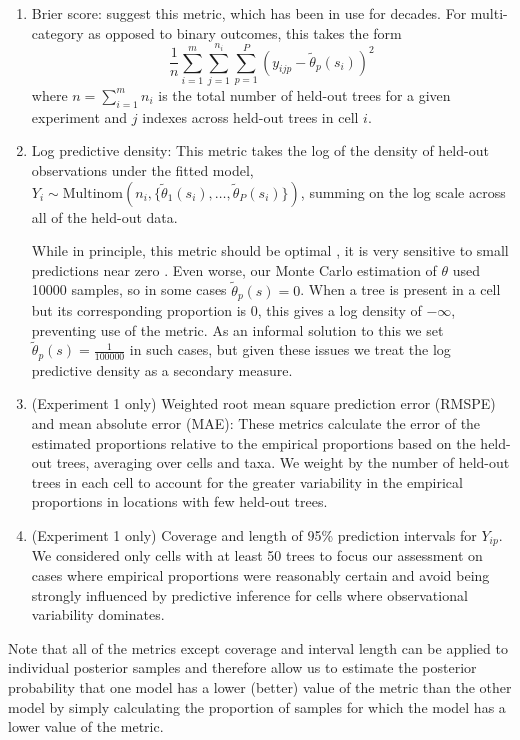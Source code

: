 \documentclass[12pt]{article}
\begin{document}
\begin{enumerate}
\item Brier score: \cite{Gnei:etal:2007} suggest this metric, which has
been in use for decades. For multi-category as opposed to binary outcomes,
this takes the form
\[
\frac{1}{n}\sum_{i=1}^{m}\sum_{j=1}^{n_{i}}\sum_{p=1}^{P}(y_{ijp}-\tilde{\theta}_{p}(s_{i}))^{2}
\]
where $n=\sum_{i=1}^{m}n_{i}$ is the total number of held-out trees
for a given experiment and $j$ indexes across held-out trees in cell
$i$. 
\item Log predictive density: This metric takes the log of the density of
held-out observations under the fitted model, $Y_{i}\sim\mbox{Multinom}(n_{i},\{\tilde{\theta}_{1}(s_{i}),\ldots,\tilde{\theta}_{P}(s_{i})\})$,
summing on the log scale across all of the held-out data. 


While in principle, this metric should be optimal \citep{Krnj:Drap:2014},
it is very sensitive to small predictions near zero \citep{Gnei:etal:2007}.
Even worse, our Monte Carlo estimation of $\theta$ used 10000 samples,
so in some cases $\tilde{\theta}_{p}(s)=0$. When a tree is present
in a cell but its corresponding proportion is 0, this gives a log
density of $-\infty$, preventing use of the metric. As an informal
solution to this we set $\tilde{\theta}_{p}(s)=\frac{1}{100000}$
in such cases, but given these issues we treat the log predictive
density as a secondary measure.

\item (Experiment 1 only) Weighted root mean square prediction error (RMSPE)
and mean absolute error (MAE): These metrics calculate the error of
the estimated proportions relative to the empirical proportions based
on the held-out trees, averaging over cells and taxa. We weight by
the number of held-out trees in each cell to account for the greater
variability in the empirical proportions in locations with few held-out
trees. 
\item (Experiment 1 only) Coverage and length of 95\% prediction intervals
for $Y_{ip}$. We considered only cells with at least 50 trees to
focus our assessment on cases where empirical proportions were reasonably
certain and avoid being strongly influenced by predictive inference
for cells where observational variability dominates.
\end{enumerate}
Note that all of the metrics except coverage and interval length can
be applied to individual posterior samples and therefore allow us
to estimate the posterior probability that one model has a lower (better)
value of the metric than the other model by simply calculating the
proportion of samples for which the model has a lower value of the
metric.
\end{document}

